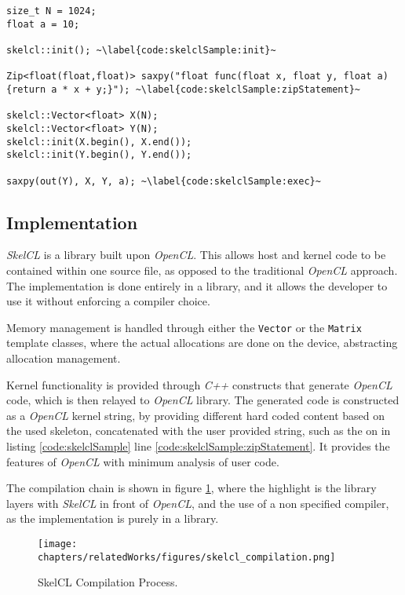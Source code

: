 \begin{lstlisting}[caption={The \textit{SAXPY} computation in \textit{SkelCL}.}, label=code:skelclSample] 
size_t N = 1024;
float a = 10;

skelcl::init(); ~\label{code:skelclSample:init}~

Zip<float(float,float)> saxpy("float func(float x, float y, float a){return a * x + y;}"); ~\label{code:skelclSample:zipStatement}~

skelcl::Vector<float> X(N);      
skelcl::Vector<float> Y(N);
skelcl::init(X.begin(), X.end()); 
skelcl::init(Y.begin(), Y.end());

saxpy(out(Y), X, Y, a); ~\label{code:skelclSample:exec}~
\end{lstlisting}

\subsection{Implementation}
\textit{SkelCL} is a library built upon \textit{OpenCL}. This allows host and kernel code to be contained within one source file, as opposed to the traditional \textit{OpenCL} approach.
The implementation is done entirely in a library, and it allows the developer to use it without enforcing a compiler choice.

Memory management is handled through either the \texttt{Vector} or the \texttt{Matrix} template classes, where the actual allocations are done on the device, abstracting allocation management.

Kernel functionality is provided through \textit{C++} constructs that generate \textit{OpenCL} code, which is then relayed to \textit{OpenCL} library. The generated code is constructed as a \textit{OpenCL} kernel string, by providing different hard coded content based on the used skeleton, concatenated with the user provided string, such as the on in listing \ref{code:skelclSample} line \ref{code:skelclSample:zipStatement}. It provides the features of \textit{OpenCL} with minimum analysis of user code.

The compilation chain is shown in figure \ref{fig:skelclCompilation}, where the highlight is the library layers with \textit{SkelCL} in front of \textit{OpenCL}, and the use of a non specified compiler, as the implementation is purely in a library.
\begin{figure}[H]
\center
\texttt{[image: chapters/relatedWorks/figures/skelcl\_compilation.png]}
\caption{SkelCL Compilation Process.}
\label{fig:skelclCompilation}
\end{figure}


